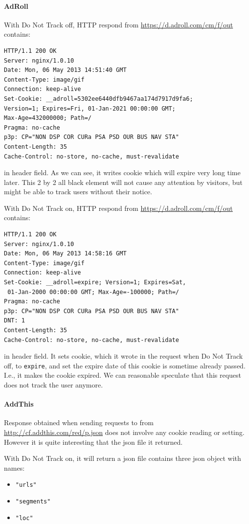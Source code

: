 \documentclass{sig-alternate}
\begin{document}
\paragraph{AdRoll}
With Do Not Track off, HTTP respond from \url{https://d.adroll.com/cm/f/out} contains:
\begin{verbatim}
HTTP/1.1 200 OK
Server: nginx/1.0.10
Date: Mon, 06 May 2013 14:51:40 GMT
Content-Type: image/gif
Connection: keep-alive
Set-Cookie: __adroll=5302ee6440dfb9467aa174d7917d9fa6; 
Version=1; Expires=Fri, 01-Jan-2021 00:00:00 GMT; 
Max-Age=432000000; Path=/
Pragma: no-cache
p3p: CP="NON DSP COR CURa PSA PSD OUR BUS NAV STA"
Content-Length: 35
Cache-Control: no-store, no-cache, must-revalidate
\end{verbatim}
in header field. As we can see, it writes cookie which will expire very long time later. This 2 by 2 all black element will not cause any attention by visitors, but might be able to track users without their notice.

With Do Not Track on, HTTP respond from \url{https://d.adroll.com/cm/f/out} contains:
\begin{verbatim}
HTTP/1.1 200 OK
Server: nginx/1.0.10
Date: Mon, 06 May 2013 14:58:16 GMT
Content-Type: image/gif
Connection: keep-alive
Set-Cookie: __adroll=expire; Version=1; Expires=Sat,
 01-Jan-2000 00:00:00 GMT; Max-Age=-100000; Path=/
Pragma: no-cache
p3p: CP="NON DSP COR CURa PSA PSD OUR BUS NAV STA"
DNT: 1
Content-Length: 35
Cache-Control: no-store, no-cache, must-revalidate
\end{verbatim}
in header field. It sets cookie, which it wrote in the request when Do Not Track off, to \verb|expire|, and set the expire date of this cookie is sometime already passed. I.e., it makes the cookie expired. We can reasonable speculate that this request does not track the user anymore.

\paragraph{AddThis}
Response obtained when sending requests to from \url{http://cf.addthis.com/red/p.json} does not involve any cookie reading or setting. However it is quite interesting that the json file it returned.

With Do Not Track on, it will return a json file contains three json object with names:

\begin{itemize}
\item \verb|"urls"|
\item \verb|"segments"|
\item \verb|"loc"|
\end{itemize}
\end{document}

